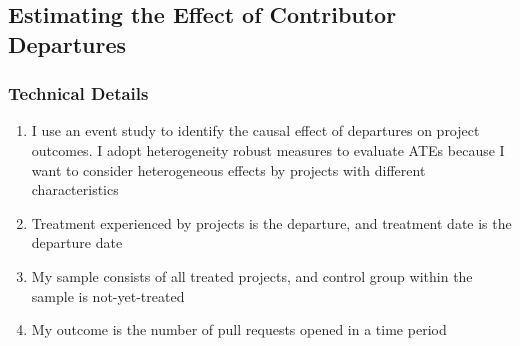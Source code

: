 \documentclass[12pt,notitlepage]{article}
\begin{document}
\subsection{Estimating the Effect of Contributor Departures}
\subsubsection{Technical Details}
\begin{enumerate}
    \item I use an event study to identify the causal effect of departures on project outcomes. I adopt heterogeneity robust measures to evaluate ATEs because I want to consider heterogeneous effects by projects with different characteristics
    \item Treatment experienced by projects is the departure, and treatment date is the departure date
    \item My sample consists of all treated projects, and control group within the sample is not-yet-treated
    \item My outcome is the number of pull requests opened in a time period
\end{enumerate}
\end{document}
